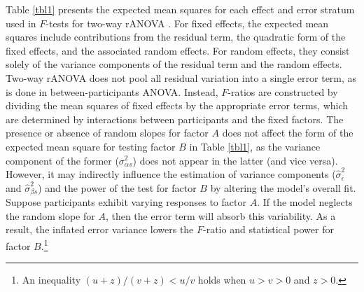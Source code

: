\documentclass[preprint,12pt,authoryear]{elsarticle}
\begin{document}
Table \ref{tbl1} presents the expected mean squares for each effect and error stratum used in $F$-tests for two-way rANOVA \citetext{%
	\citealp[p.~189]{myers_fundamentals_1979}; %
	see also \citealp[p.~37]{girden_anova_1992}; %
	\citealp[p.~672]{maxwell_designing_2017}}.
For fixed effects, the expected mean squares include contributions from the residual term, the quadratic form of the fixed effects, and the associated random effects. For random effects, they consist solely of the variance components of the residual term and the random effects. Two-way rANOVA does not pool all residual variation into a single error term, as is done in between-participants ANOVA. Instead, $F$-ratios are constructed by dividing the mean squares of fixed effects by the appropriate error terms, which are determined by interactions between participants and the fixed factors. The presence or absence of random slopes for factor $A$ does not affect the form of the expected mean square for testing factor $B$ in Table \ref{tbl1}, as the variance component of the former ($\sigma_{\alpha s}^2$) does not appear in the latter (and vice versa). However, it may indirectly influence the estimation of variance components (${\hat{\sigma}}_\epsilon^2$ and ${\hat{\sigma}}_{\beta s}^2$) and the power of the test for factor $B$ by altering the model's overall fit. Suppose participants exhibit varying responses to factor $A$. If the model neglects the random slope for $A$, then the error term will absorb this variability. As a result, the inflated error variance lowers the $F$-ratio and statistical power for factor $B$.\footnote[2]{An inequality $(u+z)/(v+z)<u/v$ holds when $u>v>0$ and $z>0$.}
\end{document}
